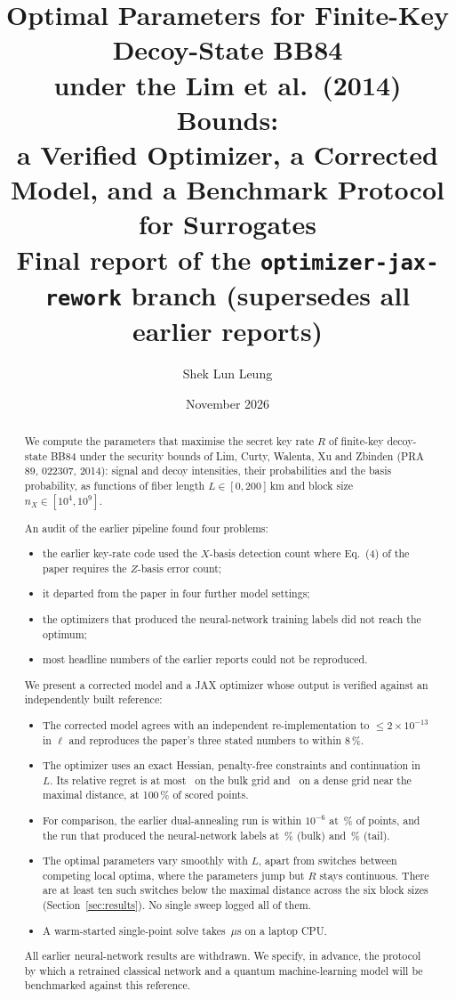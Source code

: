 \documentclass[11pt,a4paper]{article}
\title{Optimal Parameters for Finite-Key Decoy-State BB84\\
under the Lim et al.\ (2014) Bounds:\\
a Verified Optimizer, a Corrected Model, and a Benchmark Protocol for Surrogates\\[6pt]
\large Final report of the \texttt{optimizer-jax-rework} branch (supersedes all earlier reports)}
\author{Shek Lun Leung}
\date{November 2026}
\begin{document}
\maketitle

\begin{abstract}
We compute the parameters that maximise the secret key rate $R$ of finite-key decoy-state BB84 under the security
bounds of Lim, Curty, Walenta, Xu and Zbinden (PRA 89, 022307, 2014): signal and decoy intensities, their
probabilities and the basis probability, as functions of fiber length $L\in[0,200]$\,km and block size
$n_X\in[10^4,10^9]$.

An audit of the earlier pipeline found four problems:
\begin{itemize}
\item the earlier key-rate code used the $X$-basis detection count where Eq.~(4) of the paper requires the
  $Z$-basis error count;
\item it departed from the paper in four further model settings;
\item the optimizers that produced the neural-network training labels did not reach the optimum;
\item most headline numbers of the earlier reports could not be reproduced.
\end{itemize}

We present a corrected model and a JAX optimizer whose output is verified against an independently built
reference:
\begin{itemize}
\item The corrected model agrees with an independent re-implementation to $\le2\times10^{-13}$ in $\ell$ and
  reproduces the paper's three stated numbers to within 8\,\%.
\item The optimizer uses an exact Hessian, penalty-free constraints and continuation in $L$. Its relative regret
  is at most \QKDLimNewWarmRegretMax\ on the bulk grid and \QKDLimTailNewWarmRegretMax\ on a dense grid near the
  maximal distance, at 100\,\% of scored points.
\item For comparison, the earlier dual-annealing run is within $10^{-6}$ at \QKDLegacyOldDAPctWithin\,\% of
  points, and the run that produced the neural-network labels at \QKDLegacyOldFoRPctWithin\,\% (bulk) and
  \QKDLegacyTailOldFoRPctWithin\,\% (tail).
\item The optimal parameters vary smoothly with $L$, apart from switches between competing local optima, where the
  parameters jump but $R$ stays continuous. There are at least ten such switches below the maximal distance across
  the six block sizes (Section~\ref{sec:results}). No single sweep logged all of them.
\item A warm-started single-point solve takes \QKDLimWarmDeviceUs\,$\mu$s on a laptop CPU.
\end{itemize}

All earlier neural-network results are withdrawn. We specify, in advance, the protocol by which a retrained
classical network and a quantum machine-learning model will be benchmarked against this reference.
\end{abstract}
\end{document}

